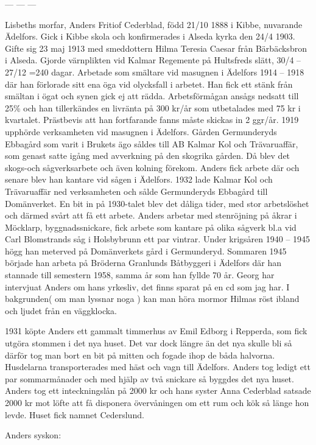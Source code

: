 --- --- ---

Lisbeths morfar, Anders Fritiof Cederblad, född 21/10 1888 i Kibbe, nuvarande Ädelfors. Gick i Kibbe skola och konfirmerades i Alseda kyrka den 24/4 1903. Gifte sig 23 maj 1913 med smeddottern Hilma Teresia Caesar från Bärbäcksbron i Alseda.
Gjorde värnplikten vid Kalmar Regemente på Hultsfreds slätt, 30/4 – 27/12 =240 dagar.
Arbetade som smältare vid masugnen i Ädelfors 1914 – 1918 där han förlorade sitt ena öga vid  olycksfall i arbetet. Han fick ett stänk från smältan i ögat och synen gick ej att rädda. Arbetsförmågan ansågs nedsatt till 25\% och han tillerkändes en livränta på 300 kr/år som utbetalades med 75 kr i kvartalet. Prästbevis att han fortfarande fanns måste skickas in 2 ggr/år.
1919 upphörde verksamheten vid masugnen i Ädelfors.
Gården Germunderyds Ebbagård som varit i Brukets ägo såldes till AB Kalmar Kol och Trävaruaffär, som genast satte igång med avverkning på den skogrika gården. Då blev det skogs-och sågverksarbete och även kolning förekom. Anders fick arbete där och senare blev han kantare vid sågen i Ädelfors.
1932 lade Kalmar Kol och Trävaruaffär ned verksamheten och sålde Germunderyds Ebbagård till Domänverket.
En bit in på 1930-talet blev det dåliga tider, med stor arbetslöshet och därmed svårt att få ett arbete. Anders arbetar med stenröjning på åkrar i Möcklarp, byggnadssnickare, fick arbete som kantare på olika sågverk bl.a vid Carl Blomstrands såg i Holsbybrunn ett par vintrar.
Under krigsåren 1940 – 1945 högg han meterved på Domänverkets gård i Germunderyd. Sommaren 1945 började han arbeta på Bröderna Granlunds Båtbyggeri i Ädelfors där han stannade till semestern 1958, samma år som han fyllde 70 år.
Georg har intervjuat Anders om hans yrkesliv, det finns sparat på en cd som jag har. I bakgrunden( om man lyssnar noga ) kan man höra mormor Hilmas röst ibland och ljudet från en väggklocka.

1931 köpte Anders ett gammalt timmerhus av Emil Edborg i Repperda, som fick utgöra stommen i det nya huset. Det var dock längre än det nya skulle bli så därför tog man bort en bit på mitten och fogade ihop de båda halvorna. Husdelarna transporterades med häst och vagn till Ädelfors. Anders tog ledigt ett par sommarmånader och med hjälp av två snickare så byggdes det nya huset.
Anders tog ett inteckningslån på 2000 kr och hans syster Anna Cederblad satsade 2000 kr mot löfte att få disponera övervåningen om ett rum och kök så länge hon levde.
Huset fick namnet Cederslund.

Anders syskon:

